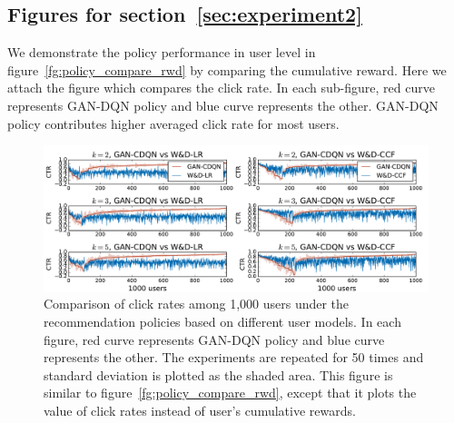 \documentclass{article} %
\begin{document}
\subsection{Figures for section~\ref{sec:experiment2}}\label{app:exp_policy2}
 We demonstrate the policy performance in user level in figure~\ref{fg:policy_compare_rwd} by comparing the cumulative reward. Here we attach the figure which compares the click rate. In each sub-figure, red curve represents {\small GAN}-DQN policy and blue curve represents the other. {\small GAN}-DQN policy contributes higher averaged click rate for most users.
\begin{figure}[ht!]
\centering
\includegraphics[width=\textwidth]{Figs/compare_clc_5000.pdf}	
\caption{\small Comparison of click rates among 1,000 users under the recommendation policies based on different user models. In each figure, red curve represents {\small GAN}-DQN policy and blue curve represents the other. The experiments are repeated for 50 times and standard deviation is plotted as the shaded area. This figure is similar to figure~\ref{fg:policy_compare_rwd}, except that it plots the value of click rates instead of user's cumulative rewards.}
\end{figure}
\end{document}
